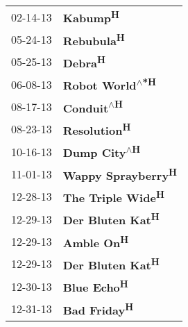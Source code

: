 \begin{supertabular}{p{0.25\columnwidth}p{0.75\columnwidth}}
 02-14-13 &                \textbf{Kabump\textsuperscript{H}} \\
 05-24-13 &              \textbf{Rebubula\textsuperscript{H}} \\
 05-25-13 &                 \textbf{Debra\textsuperscript{H}} \\
 06-08-13 &  \textbf{Robot World\textsuperscript{$\wedge$*H}} \\
 08-17-13 &       \textbf{Conduit\textsuperscript{$\wedge$H}} \\
 08-23-13 &            \textbf{Resolution\textsuperscript{H}} \\
 10-16-13 &     \textbf{Dump City\textsuperscript{$\wedge$H}} \\
 11-01-13 &      \textbf{Wappy Sprayberry\textsuperscript{H}} \\
 12-28-13 &       \textbf{The Triple Wide\textsuperscript{H}} \\
 12-29-13 &        \textbf{Der Bluten Kat\textsuperscript{H}} \\
 12-29-13 &              \textbf{Amble On\textsuperscript{H}} \\
 12-29-13 &        \textbf{Der Bluten Kat\textsuperscript{H}} \\
 12-30-13 &             \textbf{Blue Echo\textsuperscript{H}} \\
 12-31-13 &            \textbf{Bad Friday\textsuperscript{H}} \\
\end{supertabular}
